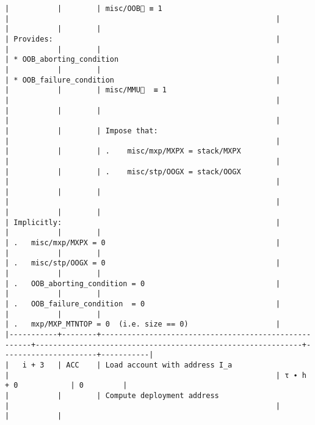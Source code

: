 \documentclass[varwidth=\maxdimen,margin=0.5cm,multi={verbatim}]{standalone}
\begin{document}
\begin{verbatim}
|           |        | misc/OOB🚩 ≡ 1                                       |                                                             |
|           |        |                                                      | Provides:                                                   |
|           |        |                                                      | * OOB_aborting_condition                                    |
|           |        |                                                      | * OOB_failure_condition                                     |
|           |        | misc/MMU🚩  ≡ 1                                      |                                                             |
|           |        |                                                      |                                                             |
|           |        | Impose that:                                         |                                                             |
|           |        | .    misc/mxp/MXPX = stack/MXPX                      |                                                             |
|           |        | .    misc/stp/OOGX = stack/OOGX                      |                                                             |
|           |        |                                                      |                                                             |
|           |        |                                                      | Implicitly:                                                 |
|           |        |                                                      | .   misc/mxp/MXPX = 0                                       |
|           |        |                                                      | .   misc/stp/OOGX = 0                                       |
|           |        |                                                      | .   OOB_aborting_condition = 0                              |
|           |        |                                                      | .   OOB_failure_condition  = 0                              |
|           |        |                                                      | .   mxp/MXP_MTNTOP = 0  (i.e. size == 0)                    |
|-----------+--------+------------------------------------------------------+-------------------------------------------------------------+----------------------+-----------|
|   i + 3   | ACC    | Load account with address I_a                        |                                                             | τ ∙ h + 0            | 0         |
|           |        | Compute deployment address                           |                                                             |                      |           |

\end{verbatim}
\end{document}
